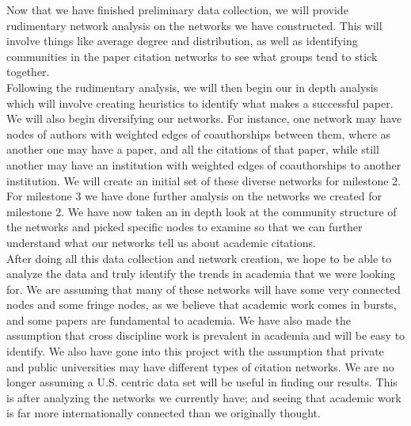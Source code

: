 \documentclass[times, 10pt,twocolumn]{article}
\begin{document}
Now that we have finished preliminary data collection, we will provide rudimentary network analysis on the networks we have constructed. This will involve things like average degree and distribution, as well as identifying communities in the paper citation networks to see what groups tend to stick together. \\

Following the rudimentary analysis, we will then begin our in depth analysis which will involve creating heuristics to identify what makes a successful paper. We will also begin diversifying our networks. For instance, one network may have nodes of authors with weighted edges of coauthorships between them, where as another one may have a paper, and all the citations of that paper, while still another may have an institution with weighted edges of coauthorships to another institution. We will create an initial set of these diverse networks for milestone 2.\\

For milestone 3 we have done further analysis on the networks we created for milestone 2. We have now taken an in depth look at the community structure of the networks and picked specific nodes to examine so that we can further understand what our networks tell us about academic citations. \\

After doing all this data collection and network creation, we hope to be able to analyze the data and truly identify the trends in academia that we were looking for. We are assuming that many of these networks will have some very connected nodes and some fringe nodes, as we believe that academic work comes in bursts, and some papers are fundamental to academia. We have also made the assumption that cross discipline work is prevalent in academia and will be easy to identify. We also have gone into this project with the assumption that private and public universities may have different types of citation networks. We are no longer assuming a U.S. centric data set will be useful in finding our results. This is after analyzing the networks we currently have; and seeing that academic work is far more internationally connected than we originally thought.

\end{document}

